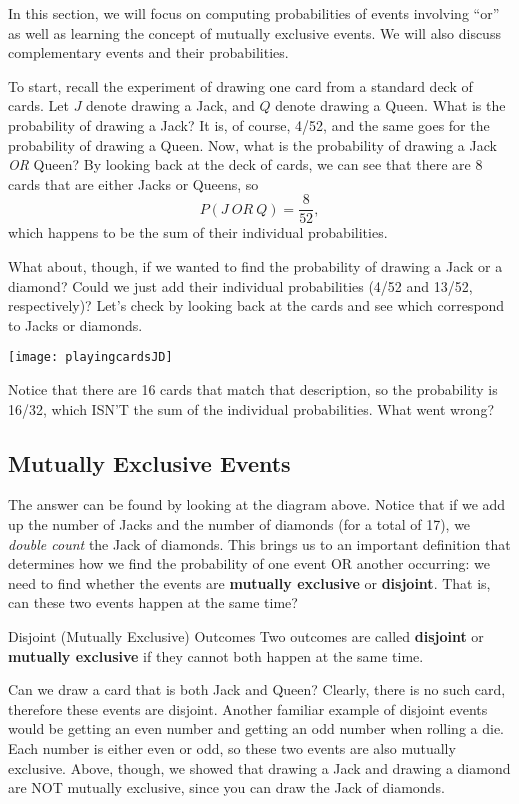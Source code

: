 \setcounter{ExampleCounter}{1}

In this section, we will focus on computing probabilities of events involving ``or'' as well as learning the concept of mutually exclusive events. We will also discuss complementary events and their probabilities. 

To start, recall the experiment of drawing one card from a standard deck of cards. Let $J$ denote drawing a Jack, and $Q$ denote drawing a Queen. What is the probability of drawing a Jack? It is, of course, 4/52, and the same goes for the probability of drawing a Queen. Now, what is the probability of drawing a Jack \emph{OR} Queen?  By looking back at the deck of cards, we can see that there are 8 cards that are either Jacks or Queens, so 
\[P(J \ OR \ Q)=\dfrac{8}{52},\]
which happens to be the sum of their individual probabilities.

What about, though, if we wanted to find the probability of drawing a Jack or a diamond?  Could we just add their individual probabilities (4/52 and 13/52, respectively)?  Let's check by looking back at the cards and see which correspond to Jacks or diamonds.
\begin{center}
\texttt{[image: playingcardsJD]}
\end{center}
Notice that there are 16 cards that match that description, so the probability is 16/32, which ISN'T the sum of the individual probabilities.  What went wrong?

\subsection{Mutually Exclusive Events}
The answer can be found by looking at the diagram above.  Notice that if we add up the number of Jacks and the number of diamonds (for a total of 17), we \textit{double count} the Jack of diamonds.  This brings us to an important definition that determines how we find the probability of one event OR another occurring: we need to find whether the events are \textbf{mutually exclusive} or \textbf{disjoint}.  That is, can these two events happen at the same time?
\begin{proc}{Disjoint (Mutually Exclusive) Outcomes}
Two outcomes are called \textbf{disjoint} or \textbf{mutually exclusive} if they cannot both happen at the same time.
\end{proc}
Can we draw a card that is both Jack and Queen? Clearly, there is no such card, therefore these events are disjoint. Another familiar example of disjoint events would be getting an even number and getting an odd number when rolling a die. Each number is either even or odd, so these two events are also mutually exclusive.  Above, though, we showed that drawing a Jack and drawing a diamond are NOT mutually exclusive, since you can draw the Jack of diamonds.

